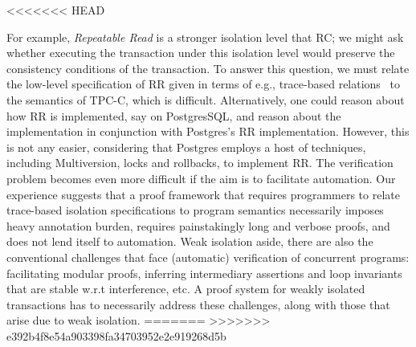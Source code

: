 <<<<<<< HEAD


For example, \emph{Repeatable
  Read} is a stronger isolation level that RC; we might ask whether
executing the  transaction under this isolation level
would preserve the consistency conditions of the transaction.  To
answer this question, we must relate the low-level specification of RR
given in terms of e.g., trace-based
relations~\cite{adyaphd,gotsmanconcur15} to the semantics of TPC-C,
which is difficult.   Alternatively, one could reason about how RR is
implemented, say on PostgresSQL, and reason about the 
implementation in conjunction with Postgres's RR
implementation. However, this is not any easier, considering that
Postgres employs a host of techniques, including Multiversion, locks
and rollbacks, to implement RR. The verification problem becomes even
more difficult if the aim is to facilitate automation. Our experience
suggests that a proof framework that requires programmers to relate
trace-based isolation specifications to program semantics necessarily
imposes heavy annotation burden, requires painstakingly long and
verbose proofs, and does not lend itself to automation. Weak isolation
aside, there are also the conventional challenges that face
(automatic) verification of concurrent programs: facilitating modular
proofs, inferring intermediary assertions and loop invariants that are
stable w.r.t interference, etc. A proof system for weakly isolated
transactions has to necessarily address these challenges, along with
those that arise due to weak isolation.
=======
>>>>>>> e392b4f8e54a903398fa34703952e2e919268d5b
